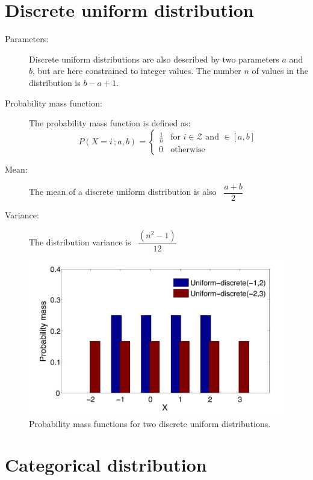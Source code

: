 \section*{Discrete uniform distribution}

\begin{description}
\item [Parameters: ] Discrete uniform distributions are also described by two parameters $a$ and $b$, but are here constrained to integer values. The number $n$ of values in the distribution is $b-a+1$. 

\item [Probability mass function: ] The probability mass function is defined as:
\begin{equation}
P(X\!=\!i\,; a, b) = \begin{cases}
\frac{1}{n} & \text{for } i \in \mathcal{Z} \text{ and } \in [a,b]  \\
0               & \text{otherwise}
\end{cases}
\end{equation} 
\item [Mean: ] The mean of a discrete uniform distribution is also \  $\dfrac{a+b}{2}$

\item [Variance: ] The distribution variance is \ $\dfrac{(n^2 -1)}{12}$
\end{description}

\begin{figure}[h]
\centering
\includegraphics[scale=0.40]{imgs/uniformd-appendix.pdf}
\caption{Probability mass functions for two discrete uniform distributions.} 
\label{fig:uniformd-appendix}
\end{figure}

\section*{Categorical distribution}

